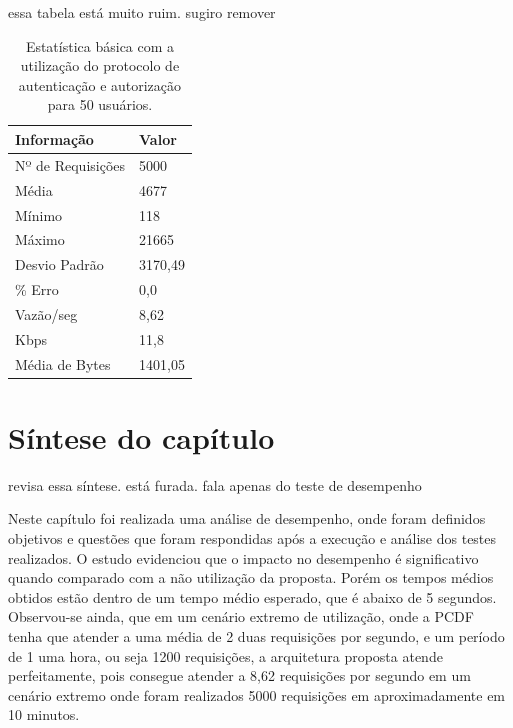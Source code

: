 {\color{red}essa tabela est\'{a} muito ruim. sugiro remover} 

\begin{table}[h]
\centering
\begin{tabular}{|l|l|}
\hline
\textbf{Informação} & \textbf{Valor} \\ \hline
Nº de Requisições   &  5000              \\ \hline
Média               &  4677             \\ \hline
Mínimo              &  118          \\ \hline
Máximo              &  21665        \\ \hline
Desvio Padrão       &  3170,49      \\ \hline
\% Erro             &  0,0          \\ \hline
Vazão/seg           &  8,62     \\ \hline
Kbps                &  11,8         \\ \hline
Média de Bytes      &  1401,05      \\ \hline
\end{tabular}
\caption {Estatística básica com a utilização do protocolo de autenticação e autorização para 50 usuários.}\label{tb:estatistica_com_cripto_50}
\end{table}

\section{Síntese do capítulo}

{\color{red} revisa essa s\'{i}ntese. est\'{a} furada. fala apenas do teste de desempenho} 

Neste cap\'{i}tulo foi realizada uma análise de desempenho, onde foram definidos objetivos e questões que foram respondidas após a execução e análise dos testes realizados. O estudo evidenciou que o impacto no desempenho é significativo quando comparado com a não utilização da proposta. Porém os tempos médios obtidos estão dentro de um tempo médio esperado, que é abaixo de 5 segundos. Observou-se ainda, que em um cenário extremo de utilização, onde a PCDF tenha que atender a uma média de 2 duas requisições por segundo, e um período de 1 uma hora, ou seja 1200 requisições, a arquitetura proposta atende perfeitamente, pois consegue atender a 8,62 requisições por segundo em um cenário extremo onde foram realizados 5000 requisições em aproximadamente em 10 minutos. 